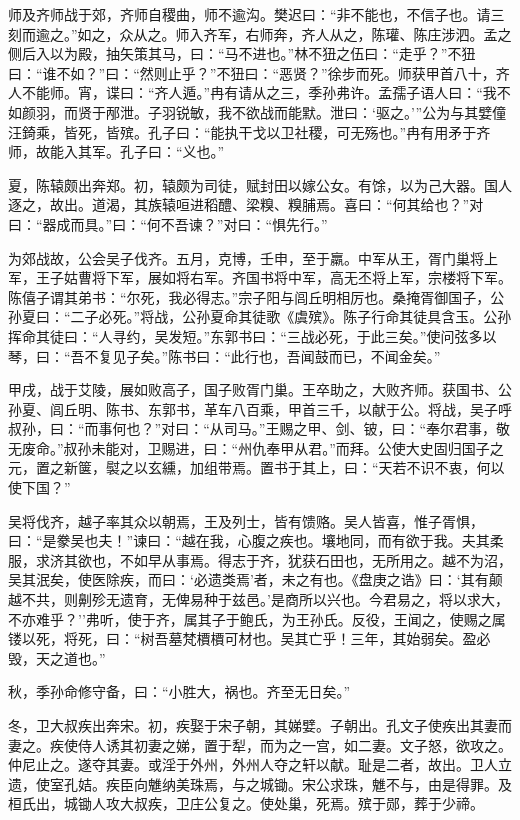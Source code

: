 \documentclass[]{article}
\begin{document}
师及齐师战于郊，齐师自稷曲，师不逾沟。樊迟曰：``非不能也，不信子也。请三刻而逾之。''如之，众从之。师入齐军，右师奔，齐人从之，陈瓘、陈庄涉泗。孟之侧后入以为殿，抽矢策其马，曰：``马不进也。''林不狃之伍曰：``走乎？''不狃曰：``谁不如？''曰：``然则止乎？''不狃曰：``恶贤？''徐步而死。师获甲首八十，齐人不能师。宵，谍曰：``齐人遁。''冉有请从之三，季孙弗许。孟孺子语人曰：``我不如颜羽，而贤于邴泄。子羽锐敏，我不欲战而能默。泄曰：`驱之。'''公为与其嬖僮汪錡乘，皆死，皆殡。孔子曰：``能执干戈以卫社稷，可无殇也。''冉有用矛于齐师，故能入其军。孔子曰：``义也。''

夏，陈辕颇出奔郑。初，辕颇为司徒，赋封田以嫁公女。有馀，以为己大器。国人逐之，故出。道渴，其族辕咺进稻醴、梁糗、糗脯焉。喜曰：``何其给也？''对曰：``器成而具。''曰：``何不吾谏？''对曰：``惧先行。''

为郊战故，公会吴子伐齐。五月，克博，壬申，至于羸。中军从王，胥门巢将上军，王子姑曹将下军，展如将右军。齐国书将中军，高无丕将上军，宗楼将下军。陈僖子谓其弟书：``尔死，我必得志。''宗子阳与闾丘明相厉也。桑掩胥御国子，公孙夏曰：``二子必死。''将战，公孙夏命其徒歌《虞殡》。陈子行命其徒具含玉。公孙挥命其徒曰：``人寻约，吴发短。''东郭书曰：``三战必死，于此三矣。''使问弦多以琴，曰：``吾不复见子矣。''陈书曰：``此行也，吾闻鼓而已，不闻金矣。''

甲戌，战于艾陵，展如败高子，国子败胥门巢。王卒助之，大败齐师。获国书、公孙夏、闾丘明、陈书、东郭书，革车八百乘，甲首三千，以献于公。将战，吴子呼叔孙，曰：``而事何也？''对曰：``从司马。''王赐之甲、剑、铍，曰：``奉尔君事，敬无废命。''叔孙未能对，卫赐进，曰：``州仇奉甲从君。''而拜。公使大史固归国子之元，置之新箧，褽之以玄纁，加组带焉。置书于其上，曰：``天若不识不衷，何以使下国？''

吴将伐齐，越子率其众以朝焉，王及列士，皆有馈赂。吴人皆喜，惟子胥惧，曰：``是豢吴也夫！''谏曰：``越在我，心腹之疾也。壤地同，而有欲于我。夫其柔服，求济其欲也，不如早从事焉。得志于齐，犹获石田也，无所用之。越不为沼，吴其泯矣，使医除疾，而曰：`必遗类焉'者，未之有也。《盘庚之诰》曰：`其有颠越不共，则劓殄无遗育，无俾易种于兹邑。'是商所以兴也。今君易之，将以求大，不亦难乎？''弗听，使于齐，属其子于鲍氏，为王孙氏。反役，王闻之，使赐之属镂以死，将死，曰：``树吾墓梵檟檟可材也。吴其亡乎！三年，其始弱矣。盈必毁，天之道也。''

秋，季孙命修守备，曰：``小胜大，祸也。齐至无日矣。''

冬，卫大叔疾出奔宋。初，疾娶于宋子朝，其娣嬖。子朝出。孔文子使疾出其妻而妻之。疾使侍人诱其初妻之娣，置于犁，而为之一宫，如二妻。文子怒，欲攻之。仲尼止之。遂夺其妻。或淫于外州，外州人夺之轩以献。耻是二者，故出。卫人立遗，使室孔姞。疾臣向魋纳美珠焉，与之城锄。宋公求珠，魋不与，由是得罪。及桓氏出，城锄人攻大叔疾，卫庄公复之。使处巢，死焉。殡于郧，葬于少禘。
\end{document}
